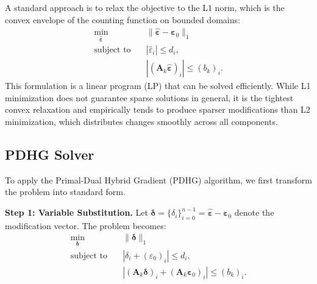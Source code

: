 \documentclass{article}
\begin{document}
A standard approach is to relax the objective to the L1 norm, which is the convex envelope of the counting function on bounded domains:
\begin{equation}
\begin{aligned}
    \min_{\hat{\boldsymbol{\varepsilon}}} \quad & \|\hat{\boldsymbol{\varepsilon}} - \boldsymbol{\varepsilon}_0\|_1 \\
    \text{subject to} \quad & |\hat{\varepsilon}_i| \le d_i, \\
    & |(\mathbf{A}_k \hat{\boldsymbol{\varepsilon}})_i| \le (b_k)_i.
\end{aligned}
\end{equation}
This formulation is a linear program (LP) that can be solved efficiently. While L1 minimization does not guarantee sparse solutions in general, it is the tightest convex relaxation and empirically tends to produce sparser modifications than L2 minimization, which distributes changes smoothly across all components.

\subsection*{PDHG Solver}

To apply the Primal-Dual Hybrid Gradient (PDHG) algorithm, we first transform the problem into standard form.

\textbf{Step 1: Variable Substitution.} Let $\boldsymbol{\delta} = \{\delta_i\}_{i=0}^{n-1} = \hat{\boldsymbol{\varepsilon}} - \boldsymbol{\varepsilon}_0$ denote the modification vector. The problem becomes:
\begin{equation}
\begin{aligned}
    \min_{\boldsymbol{\delta}} \quad & \|\boldsymbol{\delta}\|_1 \\
    \text{subject to} \quad & |\delta_i + (\varepsilon_0)_i| \le d_i, \\
    & |(\mathbf{A}_k \boldsymbol{\delta})_i + (\mathbf{A}_k \boldsymbol{\varepsilon}_0)_i| \le (b_k)_i.
\end{aligned}
\end{equation}
\end{document}
